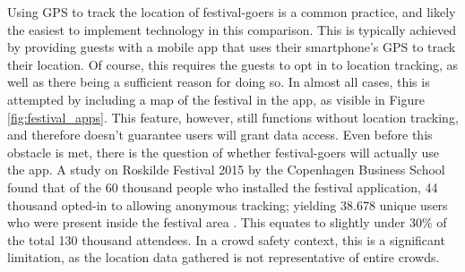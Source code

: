 Using GPS to track the location of festival-goers is a common practice, and likely the easiest to implement technology in this comparison. This is typically achieved by providing guests with a mobile app that uses their smartphone's GPS to track their location. Of course, this requires the guests to opt in to location tracking, as well as there being a sufficient reason for doing so. In almost all cases, this is attempted by including a map of the festival in the app, as visible in Figure \ref{fig:festival_apps}. This feature, however, still functions without location tracking, and therefore doesn't guarantee users will grant data access. Even before this obstacle is met, there is the question of whether festival-goers will actually use the app. A study on Roskilde Festival 2015 by the Copenhagen Business School  found that of the 60 thousand people who installed the festival application, 44 thousand opted-in to allowing anonymous tracking; yielding 38.678 unique users who were present inside the festival area \cite{rf_app}. This equates to slightly under 30\% of the total 130 thousand attendees. In a crowd safety context, this is a significant limitation, as the location data gathered is not representative of entire crowds.


